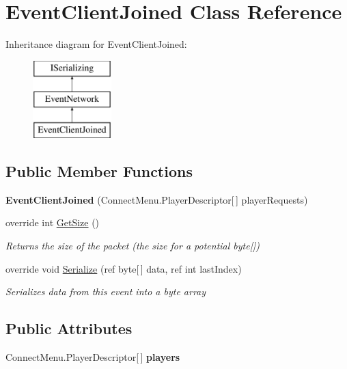 \hypertarget{class_event_client_joined}{\section{Event\-Client\-Joined Class Reference}
\label{class_event_client_joined}
}
Inheritance diagram for Event\-Client\-Joined\-:\begin{figure}[H]
\begin{center}
\leavevmode
\includegraphics[height=3.000000cm]{class_event_client_joined}
\end{center}
\end{figure}
\subsection*{Public Member Functions}
\begin{DoxyCompactItemize}
\item 
\hypertarget{class_event_client_joined_adad9451ea1a292d0b4f6ce9465065bc4}{{\bfseries Event\-Client\-Joined} (Connect\-Menu.\-Player\-Descriptor\mbox{[}$\,$\mbox{]} player\-Requests)}\label{class_event_client_joined_adad9451ea1a292d0b4f6ce9465065bc4}

\item 
override int \hyperlink{class_event_client_joined_ad556a9c7eeb4a425ecf86ec271009241}{Get\-Size} ()
\begin{DoxyCompactList}\small\item\em Returns the size of the packet (the size for a potential byte\mbox{[}\mbox{]}) \end{DoxyCompactList}\item 
override void \hyperlink{class_event_client_joined_a10a9f8d247e3446fec1cc7a1eb13e6a0}{Serialize} (ref byte\mbox{[}$\,$\mbox{]} data, ref int last\-Index)
\begin{DoxyCompactList}\small\item\em Serializes data from this event into a byte array \end{DoxyCompactList}\end{DoxyCompactItemize}
\subsection*{Public Attributes}
\begin{DoxyCompactItemize}
\item 
\hypertarget{class_event_client_joined_ac439707fdbda89656780d392ceb5033e}{Connect\-Menu.\-Player\-Descriptor\mbox{[}$\,$\mbox{]} {\bfseries players}}\label{class_event_client_joined_ac439707fdbda89656780d392ceb5033e}

\end{DoxyCompactItemize}
